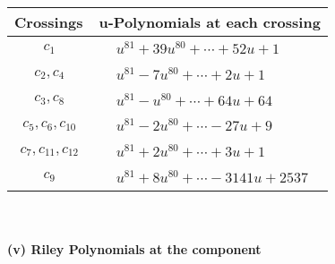 \documentclass[1p]{elsarticle_modified}
\theoremstyle{definition}
\begin{document}
\begin{tabular}{m{50pt}|m{274pt}}
Crossings & \hspace{64pt}u-Polynomials at each crossing \\
\hline $$\begin{aligned}c_{1}\end{aligned}$$&$\begin{aligned}
&u^{81}+39 u^{80}+\cdots+52 u+1
\end{aligned}$\\
\hline $$\begin{aligned}c_{2},c_{4}\end{aligned}$$&$\begin{aligned}
&u^{81}-7 u^{80}+\cdots+2 u+1
\end{aligned}$\\
\hline $$\begin{aligned}c_{3},c_{8}\end{aligned}$$&$\begin{aligned}
&u^{81}- u^{80}+\cdots+64 u+64
\end{aligned}$\\
\hline $$\begin{aligned}c_{5},c_{6},c_{10}\end{aligned}$$&$\begin{aligned}
&u^{81}-2 u^{80}+\cdots-27 u+9
\end{aligned}$\\
\hline $$\begin{aligned}c_{7},c_{11},c_{12}\end{aligned}$$&$\begin{aligned}
&u^{81}+2 u^{80}+\cdots+3 u+1
\end{aligned}$\\
\hline $$\begin{aligned}c_{9}\end{aligned}$$&$\begin{aligned}
&u^{81}+8 u^{80}+\cdots-3141 u+2537
\end{aligned}$\\
\hline
\end{tabular}\\~\\
\newpage\renewcommand{\arraystretch}{1}
\flushleft \textbf{(v) Riley Polynomials at the component}\newline \\
\end{document}
